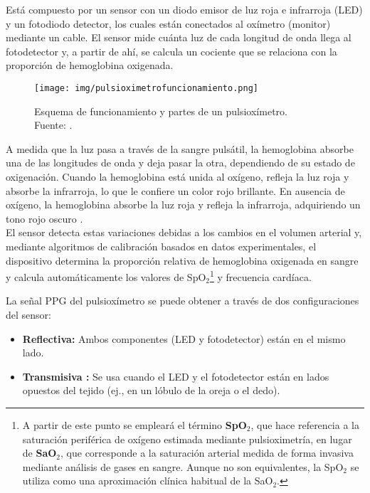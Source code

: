 Está compuesto por un sensor con un diodo emisor de luz roja e infrarroja (LED) y un fotodiodo detector, los cuales están conectados al oxímetro (monitor) mediante un cable. El sensor mide cuánta luz de cada longitud de onda llega al fotodetector y, a partir de ahí, se calcula un cociente que se relaciona con la proporción de hemoglobina oxigenada.

\begin{figure}[H]
    \centering
    \texttt{[image: img/pulsioximetrofuncionamiento.png]}
    \caption{Esquema de funcionamiento y partes de un pulsioxímetro.
    \\ Fuente: \cite{medicinajoven_pulsioximetro}. }
    \label{fig:pulsioximetro}
\end{figure}

A medida que la luz pasa a través de la sangre pulsátil, la hemoglobina absorbe una de las longitudes de onda y deja pasar la otra, dependiendo de su estado de oxigenación. Cuando la hemoglobina está unida al oxígeno, refleja la luz roja y absorbe la infrarroja, lo que le confiere un color rojo brillante. En ausencia de oxígeno, la hemoglobina absorbe la luz roja y refleja la infrarroja, adquiriendo un tono rojo oscuro \cite{imfesPulsioximetro2025}.\\

El sensor detecta estas variaciones debidas a los cambios en el volumen arterial y, mediante algoritmos de calibración basados en datos experimentales, el dispositivo determina la proporción relativa de hemoglobina oxigenada en sangre y calcula automáticamente los valores de SpO$_2$\footnote{A partir de este punto se empleará el término \textbf{SpO$_2$}, que hace referencia a la saturación periférica de oxígeno estimada mediante pulsioximetría, en lugar de \textbf{SaO$_2$}, que corresponde a la saturación arterial medida de forma invasiva mediante análisis de gases en sangre. Aunque no son equivalentes, la SpO$_2$ se utiliza como una aproximación clínica habitual de la SaO$_2$.}
 y frecuencia cardíaca.

La señal PPG del pulsioxímetro se puede obtener a través de dos configuraciones del sensor:

\begin{itemize}
    \item \textbf{Reflectiva:} Ambos componentes (LED y fotodetector) están en el mismo lado.
    \item \textbf{Transmisiva :} Se usa cuando el LED y el fotodetector están en lados opuestos del tejido (ej., en un lóbulo de la oreja o el dedo).
\end{itemize}

